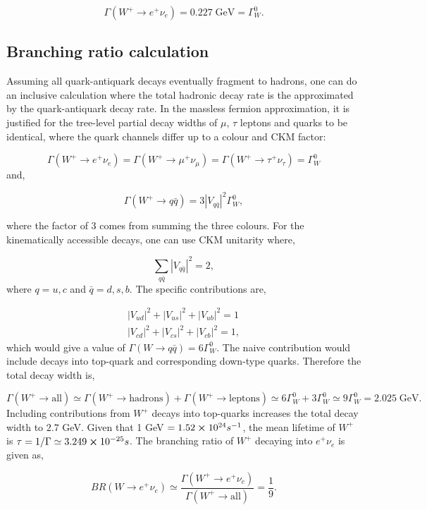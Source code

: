 \documentclass[a4paper,11pt]{article}
\begin{document}
$$
\Gamma(W^+ \rightarrow e^+ \nu_e) = 0.227\; \text{GeV} = \Gamma^0_W.
$$

\subsection{Branching ratio calculation}
Assuming all quark-antiquark decays eventually fragment to hadrons, one can do an inclusive calculation where the total hadronic decay rate is the approximated by the quark-antiquark decay rate. In the massless fermion approximation, it is justified for the tree-level partial decay widths of $\mu$, $\tau$ leptons and quarks to be identical, where the quark channels differ up to a colour and CKM factor:

$$
\Gamma(W^+ \rightarrow e^+ \nu_e) = \Gamma(W^+ \rightarrow \mu^+  \nu_\mu) = \Gamma(W^+  \rightarrow \tau^+  \nu_\tau) = \Gamma^0_W 
$$
and, 

$$ \Gamma(W^+ \rightarrow q\bar{q}) = 3 |V_{q\bar{q}}|^2 \Gamma^0_W,$$

where the factor of 3 comes from summing the three colours. For the kinematically accessible decays, one can use CKM unitarity where,

$$
\sum_{q\bar{q}} |V_{q\bar{q}}|^2 = 2, 
$$
where $q = u,c$ and $\bar{q} = d, s, b$. The specific contributions are,

\begin{equation*}
	\begin{align}
	|V_{ud}|^2 + |V_{us}|^2 +|V_{ub}|^2  =1\\
	|V_{cd}|^2 + |V_{cs}|^2 +|V_{cb}|^2  =1, 	
	\end{align}
\end{equation*}
which would give a value of $\Gamma(W \rightarrow q\bar{q}) = 6\Gamma^0_W$. The naive contribution would include decays into top-quark and corresponding down-type quarks. Therefore the total decay width is, 

$$
\Gamma(W^+ \rightarrow \text{all}) \simeq \Gamma(W^+ \rightarrow \text{hadrons}) + \Gamma(W^+ \rightarrow \text{leptons}) \simeq 6\Gamma^0_W + 3\Gamma^0_W \simeq 9\Gamma^0_W = 2.025\; \text{GeV}.
$$
Including contributions from $W^+$ decays into top-quarks increases the total decay width to $2.7$ GeV. Given that 1 GeV $= 1.52 \cross 10^{24} s^{-1}$, the mean lifetime of  $W^+$ is $\tau = 1/\Gamma \simeq 3.249 \cross 10^{-25} s$. The branching ratio of $W^+$ decaying into $e^+ \nu_e$ is given as,

\begin{equation}
	BR(W \rightarrow e^+ \nu_e) \simeq \frac{\Gamma(W^+ \rightarrow e^+ \nu_e) }{\Gamma(W^+ \rightarrow \text{all})} = \frac{1}{9}.
\end{equation}
\end{document}
